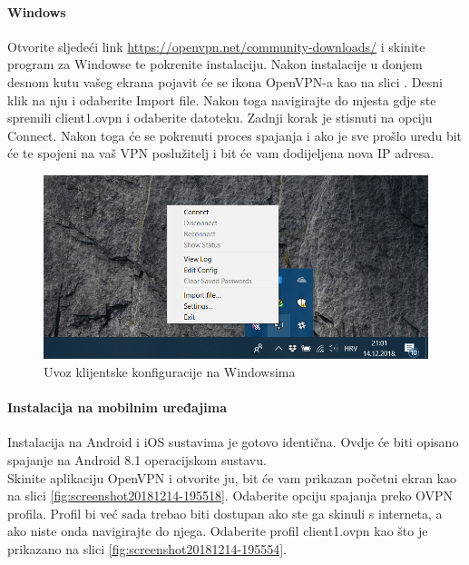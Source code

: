 \paragraph*{Windows}
\hfill \smallbreak
Otvorite sljedeći link \url{https://openvpn.net/community-downloads/} i skinite program za Windowse te pokrenite instalaciju. Nakon instalacije u donjem desnom kutu vašeg ekrana pojavit će se ikona OpenVPN-a kao na slici . Desni klik na nju i odaberite Import file. Nakon toga navigirajte do mjesta gdje ste spremili client1.ovpn i odaberite datoteku. Zadnji korak je stisnuti na opciju Connect. Nakon toga će se pokrenuti proces spajanja i ako je sve prošlo uredu bit će te spojeni na vaš VPN poslužitelj i bit će vam dodijeljena nova IP adresa.
\begin{figure}[h]
	\centering
	\includegraphics[width=0.7\linewidth]{slike/OpenVPN/win-open-vpn-2}
	\caption[Uvoz klijentske konfiguracije na Windowsima]{Uvoz klijentske konfiguracije na Windowsima}
	\label{fig:win-open-vpn-2}
\end{figure}
\bigbreak
\paragraph*{Instalacija na mobilnim uređajima}
\hfill \smallbreak
Instalacija na Android i iOS sustavima je gotovo identična. Ovdje će biti opisano spajanje na Android 8.1 operacijskom sustavu.\\ Skinite aplikaciju OpenVPN i otvorite ju, bit će vam prikazan početni ekran kao na slici \ref{fig:screenshot20181214-195518}. Odaberite opciju spajanja preko OVPN profila. Profil bi već sada trebao biti dostupan ako ste ga skinuli s interneta, a ako niste onda navigirajte do njega. Odaberite profil client1.ovpn kao što je prikazano na slici \ref{fig:screenshot20181214-195554}.



